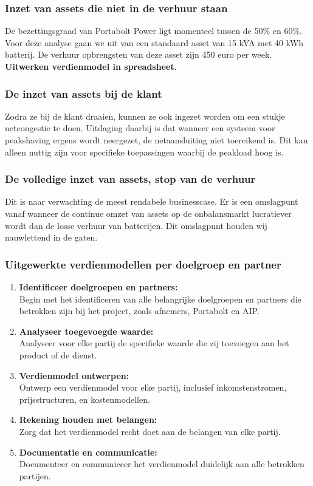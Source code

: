 \documentclass{article} %
\begin{document}
\subsubsection{Inzet van assets die niet in de verhuur staan}
\indent De bezettingsgraad van Portabolt Power ligt momenteel tussen de 50\% en 60\%. Voor deze analyse gaan we uit van een standaard asset van 15 kVA met 40 kWh batterij. De verhuur opbrengsten van deze asset zijn 450 euro per week. \\
\indent \textbf{Uitwerken verdienmodel in spreadsheet.}

\subsubsection{De inzet van assets bij de klant}
\indent Zodra ze bij de klant draaien, kunnen ze ook ingezet worden om een stukje netcongestie te doen. Uitdaging daarbij is dat wanneer een systeem voor peakshaving ergens wordt neergezet, de netaansluiting niet toereikend is. Dit kan alleen nuttig zijn voor specifieke toepassingen waarbij de peakload hoog is.

\subsubsection{De volledige inzet van assets, stop van de verhuur}
\indent Dit is naar verwachting de meest rendabele businesscase. Er is een omslagpunt vanaf wanneer de continue omzet van assets op de onbalansmarkt lucratiever wordt dan de losse verhuur van batterijen. Dit omslagpunt houden wij nauwlettend in de gaten.

\subsubsection{Uitgewerkte verdienmodellen per doelgroep en partner}
\begin{enumerate}
    \item \textbf{Identificeer doelgroepen en partners:} \\
    \indent Begin met het identificeren van alle belangrijke doelgroepen en partners die betrokken zijn bij het project, zoals afnemers, Portabolt en AIP.
    \item \textbf{Analyseer toegevoegde waarde:} \\
    \indent Analyseer voor elke partij de specifieke waarde die zij toevoegen aan het product of de dienst.
    \item \textbf{Verdienmodel ontwerpen:} \\
    \indent Ontwerp een verdienmodel voor elke partij, inclusief inkomstenstromen, prijsstructuren, en kostenmodellen.
    \item \textbf{Rekening houden met belangen:} \\
    \indent Zorg dat het verdienmodel recht doet aan de belangen van elke partij.
    \item \textbf{Documentatie en communicatie:} \\
    \indent Documenteer en communiceer het verdienmodel duidelijk aan alle betrokken partijen.
\end{enumerate}
\end{document}
